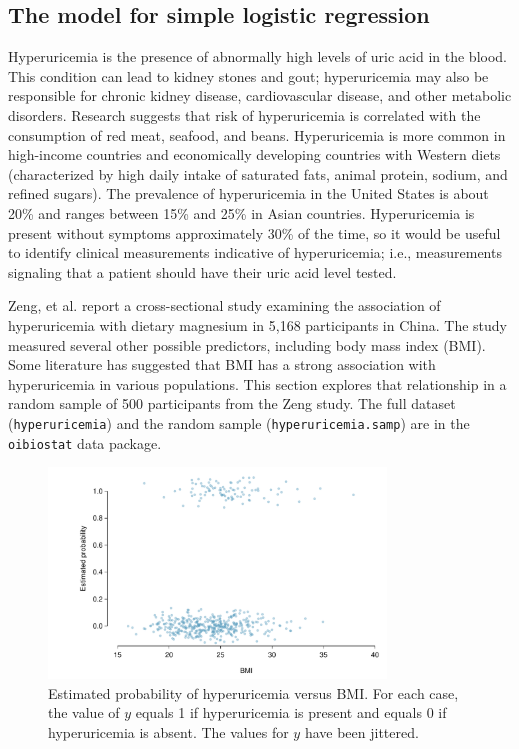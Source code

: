\subsection{The model for simple logistic regression}

Hyperuricemia is the presence of abnormally high levels of uric acid in the blood.  This condition can lead to kidney stones and gout; hyperuricemia may also be responsible for chronic kidney disease, cardiovascular disease, and other metabolic disorders. Research suggests that risk of hyperuricemia is correlated with the consumption of red meat, seafood, and beans. Hyperuricemia is more common in high-income countries and economically developing countries with Western diets (characterized by high daily intake of saturated fats, animal protein, sodium, and refined sugars). The prevalence of hyperuricemia in the United States is about 20\% and ranges between 15\% and 25\% in Asian countries.  Hyperuricemia is present without symptoms approximately 30\% of the time, so it would be useful to identify clinical measurements indicative of hyperuricemia; i.e., measurements signaling that a patient should have their uric acid level tested.


Zeng, et al. report a cross-sectional study examining the association of hyperuricemia with dietary magnesium in 5,168 participants in China. The study measured several other possible predictors, including body mass index (BMI).  Some literature has suggested that BMI has a strong association with hyperuricemia in various populations. This section explores that relationship in a random sample of 500 participants from the Zeng study. The full dataset (\texttt{hyperuricemia}) and the random sample (\texttt{hyperuricemia.samp}) are in the \texttt{oibiostat} data package.


 \begin{figure}[h!]
 	\centering
 	\includegraphics[width=0.80\textwidth]
 	{ch_logistic_regression_oi_biostat/figures/bmiHuProbSecondTile/bmiHuProbSecondTileDataOnly.pdf}
     \caption{Estimated probability of hyperuricemia versus BMI. For each case, the value of $y$ equals 1 if hyperuricemia is present and equals 0 if hyperuricemia is absent. The values for $y$ have been jittered.}
     \label{figure:bmiHuProbSecondTileDataOnly}
 \end{figure}


